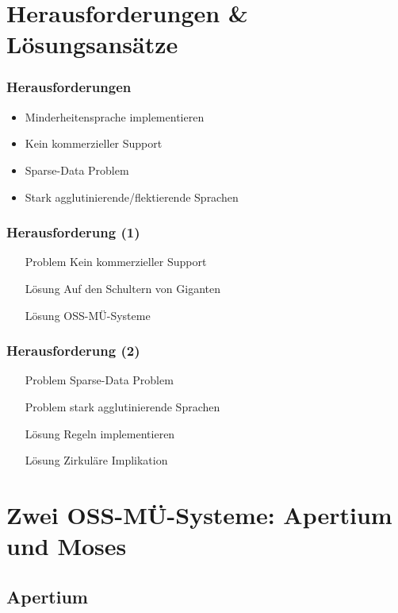\documentclass{beamer}
\begin{document}
\section{Herausforderungen \& Lösungsansätze}
\begin{frame}
  \frametitle{Herausforderungen}
  \begin{itemize}
    \item Minderheitensprache implementieren
    \item Kein kommerzieller Support
    \item Sparse-Data Problem
    \item Stark agglutinierende/flektierende Sprachen
  \end{itemize}
\end{frame}
\begin{frame}
  \frametitle{Herausforderung (1)}
  \begin{itemize}
    \item[Problem] Kein kommerzieller Support
    \item[Lösung] Auf den Schultern von Giganten
    \item[Lösung] OSS-MÜ-Systeme
  \end{itemize}
\end{frame}
\begin{frame}
  \frametitle{Herausforderung (2)}
  \begin{itemize}
    \item[Problem] Sparse-Data Problem
    \item[Problem] stark agglutinierende Sprachen
    \item[Lösung] Regeln implementieren
    \item[Lösung] Zirkuläre Implikation \cite{forcada}
  \end{itemize}
\end{frame}
\section{Zwei OSS-MÜ-Systeme: Apertium und Moses}
\subsection{Apertium}
\end{document}
